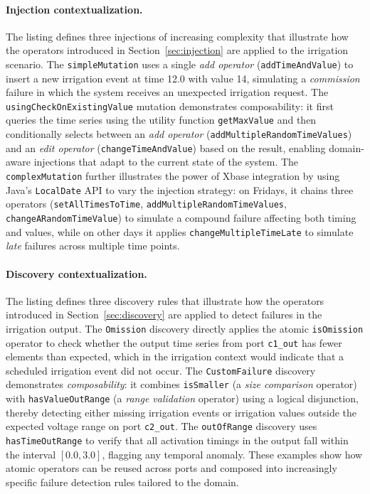 \paragraph{Injection contextualization.} The listing defines three injections of increasing complexity that illustrate how the operators introduced in Section~\ref{sec:injection} are applied to the irrigation scenario. The \texttt{simpleMutation} uses a single \textit{add operator} (\texttt{addTimeAndValue}) to insert a new irrigation event at time 12.0 with value 14, simulating a \textit{commission} failure in which the system receives an unexpected irrigation request. The \texttt{usingCheckOnExistingValue} mutation demonstrates composability: it first queries the time series using the utility function \texttt{getMaxValue} and then conditionally selects between an \textit{add operator} (\texttt{addMultipleRandomTimeValues}) and an \textit{edit operator} (\texttt{changeTimeAndValue}) based on the result, enabling domain-aware injections that adapt to the current state of the system. The \texttt{complexMutation} further illustrates the power of Xbase integration by using Java's \texttt{LocalDate} API to vary the injection strategy: on Fridays, it chains three operators (\texttt{setAllTimesToTime}, \texttt{addMultipleRandomTimeValues}, \texttt{changeARandomTimeValue}) to simulate a compound failure affecting both timing and values, while on other days it applies \texttt{changeMultipleTimeLate} to simulate \textit{late} failures across multiple time points.

\paragraph{Discovery contextualization.} The listing defines three discovery rules that illustrate how the operators introduced in Section~\ref{sec:discovery} are applied to detect failures in the irrigation output. The \texttt{Omission} discovery directly applies the atomic \texttt{isOmission} operator to check whether the output time series from port \texttt{c1\_out} has fewer elements than expected, which in the irrigation context would indicate that a scheduled irrigation event did not occur. The \texttt{CustomFailure} discovery demonstrates \textit{composability}: it combines \texttt{isSmaller} (a \textit{size comparison} operator) with \texttt{hasValueOutRange} (a \textit{range validation} operator) using a logical disjunction, thereby detecting either missing irrigation events or irrigation values outside the expected voltage range on port \texttt{c2\_out}. The \texttt{outOfRange} discovery uses \texttt{hasTimeOutRange} to verify that all activation timings in the output fall within the interval $[0.0, 3.0]$, flagging any temporal anomaly. These examples show how atomic operators can be reused across ports and composed into increasingly specific failure detection rules tailored to the domain.

